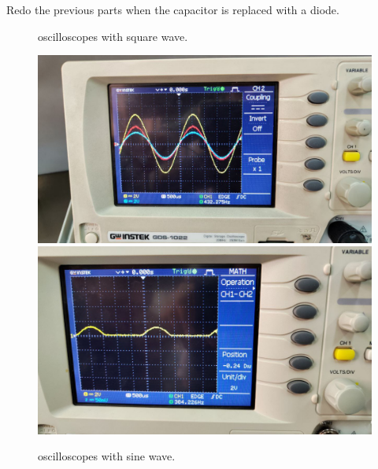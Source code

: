 \documentclass[11pt]{article}
\begin{document}
\begin{question}
\begin{subquestion}{Redo the previous parts when the capacitor is replaced with a diode.}
{\begin{figure}[H]
                \caption{oscilloscopes with square wave.}
            \end{figure}
            \begin{figure}[H]
                \centering
                \includegraphics[scale=0.1,angle=0]{Fig/23.jpeg}
                \includegraphics[scale=0.1,angle=0]{Fig/24.jpeg}
                \caption{oscilloscopes with sine wave.}
            \end{figure}
        }
    \end{subquestion}

\end{question}



\begin{question}


    \answer{
        
    }

\end{question}
\end{document}
